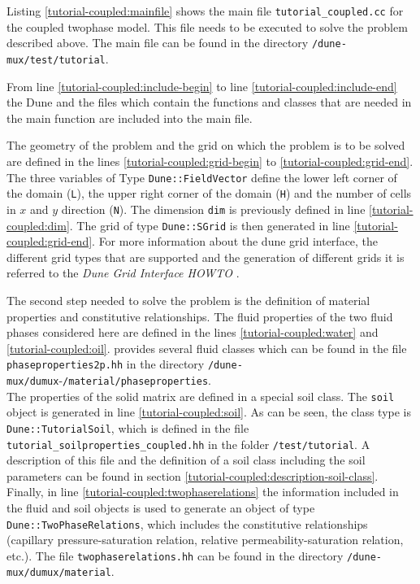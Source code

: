 Listing \ref{tutorial-coupled:mainfile} shows the main file \texttt{tutorial\_coupled.cc} for the coupled twophase model. This file needs to be executed to solve the problem described above. The main file can be found in the directory \texttt{/dune-mux/test/tutorial}.

\begin{lst}\label{tutorial-coupled:mainfile} \mbox{}

\end{lst}

From line \ref{tutorial-coupled:include-begin} to line \ref{tutorial-coupled:include-end} the Dune and the \Dumux files which contain the functions and classes that are needed in the main function are included into the main file.

The geometry of the problem and the grid on which the problem is to be solved are defined in the lines \ref{tutorial-coupled:grid-begin} to \ref{tutorial-coupled:grid-end}. The three variables of Type \texttt{Dune::FieldVector} define the lower left corner of the domain (\texttt{L}), the upper right corner of the domain (\texttt{H}) and the number of cells in $x$ and $y$ direction (\texttt{N}). The dimension \texttt{dim} is previously defined in line \ref{tutorial-coupled:dim}. The grid of type \texttt{Dune::SGrid} is then generated in line \ref{tutorial-coupled:grid-end}. For more information about the dune grid interface, the different grid types that are supported and the generation of different grids it is referred to the \textit{Dune Grid Interface HOWTO} \cite{DUNE-HP}.

The second step needed to solve the problem is the definition of material properties and constitutive relationships. The fluid properties of the two fluid phases considered here are defined in the lines \ref{tutorial-coupled:water} and \ref{tutorial-coupled:oil}. \Dumux provides several fluid classes which can be found in the file \texttt{phaseproperties2p.hh} in the directory \texttt{/dune-mux/dumux}-\texttt{/material/phaseproperties}. \\
The properties of the solid matrix are defined in a special soil class. The \texttt{soil} object is generated in line \ref{tutorial-coupled:soil}. As can be seen, the class type is \texttt{Dune::TutorialSoil}, which is defined in the file \texttt{tutorial\_soilproperties\_coupled.hh} in the folder \texttt{/test/tutorial}. A description of this file and the definition of a soil class including the soil parameters can be found in section \ref{tutorial-coupled:description-soil-class}. Finally, in line \ref{tutorial-coupled:twophaserelations} the information included in the fluid and soil objects is used to generate an object of type \texttt{Dune::TwoPhaseRelations}, which includes the constitutive relationships (capillary pressure-saturation relation, relative permeability-saturation relation, etc.). The file \texttt{twophaserelations.hh} can be found in the directory \texttt{/dune-mux/dumux/material}.

